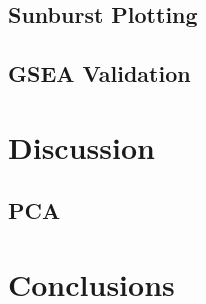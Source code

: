 \documentclass{kththesis}
\begin{document}
     \section{Sunburst Plotting}


     \section{GSEA Validation}




\chapter{Discussion}

     \section{PCA}



\chapter{Conclusions}


\printbibliography[heading=bibintoc]

\appendix


\tailmatter
\end{document}
